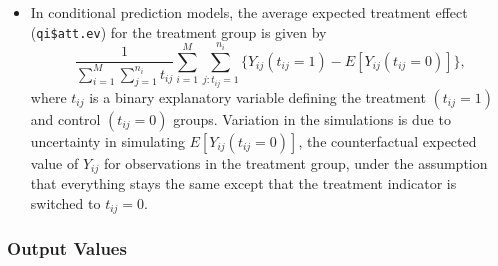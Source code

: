 \begin{itemize}
\item In conditional prediction models, the average expected treatment effect ({\tt qi\$att.ev}) for the treatment group is given by
\begin{equation*}
\frac{1}{\sum_{i = 1}^M \sum_{j = 1}^{n_i} t_{ij}} \sum_{i = 1}^M \sum_{j:t_{ij} = 1}^{n_i} \{ Y_{ij} (t_{ij} = 1) - E[Y_{ij}(t_{ij} = 0)] \},
\end{equation*}
where $t_{ij}$ is a binary explanatory variable defining the treatment $(t_{ij} = 1)$ and control $(t_{ij} = 0)$ groups. Variation in the simulations is due to uncertainty in simulating $E[Y_{ij}(t_{ij} = 0)]$, the counterfactual expected value of $Y_{ij}$ for observations in the treatment group, under the assumption that everything stays the same except that the treatment indicator is switched to $t_{ij} = 0$.

\end{itemize}

\subsubsection{Output Values}

